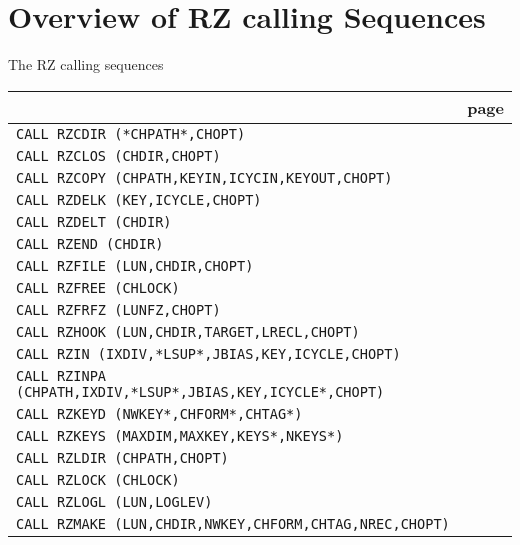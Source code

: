 \section{Overview of RZ calling Sequences}
\begin{Tabhere}
\caption{The RZ calling sequences}
\label{TRZCALL}
\begin{center}
\begin{tabular}{|>{\tt}l@{\quad}r|}
\hline
\multicolumn{1}{|c}{\bf Calling sequence} & \multicolumn{1}{r|}{\bf page}   \\
\hline
CALL RZCDIR (*CHPATH*,CHOPT)                             & \pageref{RZCDIR} \\
CALL RZCLOS (CHDIR,CHOPT)                                & \pageref{RZCLOS} \\
CALL RZCOPY (CHPATH,KEYIN,ICYCIN,KEYOUT,CHOPT)           & \pageref{RZCOPY} \\
CALL RZDELK (KEY,ICYCLE,CHOPT)                           & \pageref{RZDELK} \\
CALL RZDELT (CHDIR)                                      & \pageref{RZDELT} \\
CALL RZEND (CHDIR)                                       & \pageref{RZEND}  \\
CALL RZFILE (LUN,CHDIR,CHOPT)                            & \pageref{RZFILE} \\
CALL RZFREE (CHLOCK)                                     & \pageref{RZFREE} \\
CALL RZFRFZ (LUNFZ,CHOPT)                                & \pageref{RZFRFZ} \\
CALL RZHOOK (LUN,CHDIR,TARGET,LRECL,CHOPT)               & \pageref{RZHOOK} \\
CALL RZIN (IXDIV,*LSUP*,JBIAS,KEY,ICYCLE,CHOPT)          & \pageref{RZIN}   \\
CALL RZINPA (CHPATH,IXDIV,*LSUP*,JBIAS,KEY,ICYCLE*,CHOPT)& \pageref{RZINPA} \\
CALL RZKEYD (NWKEY*,CHFORM*,CHTAG*)                      & \pageref{RZKEYD} \\
CALL RZKEYS (MAXDIM,MAXKEY,KEYS*,NKEYS*)                 & \pageref{RZKEYS} \\
CALL RZLDIR (CHPATH,CHOPT)                               & \pageref{RZLDIR} \\
CALL RZLOCK (CHLOCK)                                     & \pageref{RZLOCK} \\
CALL RZLOGL (LUN,LOGLEV)                                 & \pageref{RZLOGL} \\
CALL RZMAKE (LUN,CHDIR,NWKEY,CHFORM,CHTAG,NREC,CHOPT)    & \pageref{RZMAKE} \\

\end{tabular}
\end{center}
\end{Tabhere}
